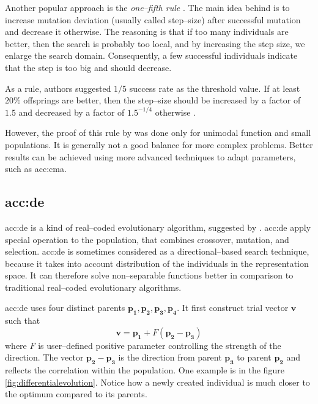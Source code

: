 Another popular approach is the \emph{one--fifth rule} \citep{onefifthrule}. The main idea behind is to increase mutation deviation (usually called step--size) after successful mutation and decrease it otherwise. The reasoning is that if too many individuals are better, then the search is probably too local, and by increasing the step size, we enlarge the search domain. Consequently, a few successful individuals indicate that the step is too big and should decrease.

As a rule, authors \citet*{onefifthruleoriginal} suggested $1/5$ success rate as the threshold value. If at least $20\%$ offsprings are better, then the step--size should be increased by a factor of $1.5$ and decreased by a factor of $1.5^{-1/4}$ otherwise \citep{onefifthrule}.

However, the proof of this rule by \citeauthor*{onefifthruleoriginal} was done only for unimodal function and small populations. It is generally not a good balance for more complex problems. Better results can be achieved using more advanced techniques to adapt parameters, such as \acrshort{acc:cma}.

\subsection{\texorpdfstring{\acrlong*{acc:de}}{Differential evolution}}

\acrfull{acc:de} is a kind of real--coded evolutionary algorithm, suggested by \citet*{differentialevolutionoriginal}. \acrshort{acc:de} apply special operation to the population, that combines crossover, mutation, and selection. \acrshort{acc:de} is sometimes considered as a directional--based search technique, because it takes into account distribution of the individuals in the representation space. It can therefore solve non--separable functions better in comparison to traditional real--coded evolutionary algorithms.

\acrshort{acc:de} uses four distinct parents $\mathbf{p_1}, \mathbf{p_2}, \mathbf{p_3}, \mathbf{p_4}$. It first construct trial vector $\mathbf{v}$ such that
$$
\mathbf{v} = \mathbf{p_1} + F\left( \mathbf{p_2} - \mathbf{p_3} \right)
$$
where $F$ is user--defined positive parameter controlling the strength of the direction. The vector $\mathbf{p_2} - \mathbf{p_3}$ is the direction from parent $\mathbf{p_3}$ to parent $\mathbf{p_2}$ and reflects the correlation within the population. One example is in the figure \ref{fig:differentialevolution}. Notice how a newly created individual is much closer to the optimum compared to its parents.

